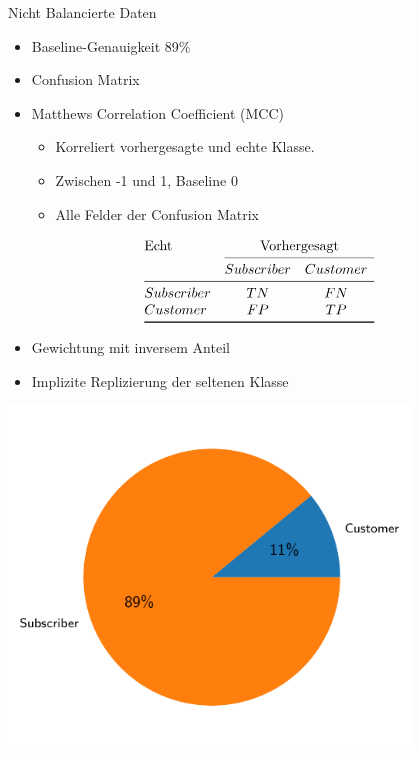 \begin{frame}{Nicht Balancierte Daten}
{
\begin{itemize}
\item Baseline-Genauigkeit 89\%
\item Confusion Matrix
\item Matthews Correlation Coefficient (MCC)
\begin{itemize}
\vspace{-1\baselineskip}
\item Korreliert vorhergesagte und echte Klasse.
\item Zwischen -1 und 1, Baseline 0
\item Alle Felder der Confusion Matrix
\end{itemize}
\end{itemize}
}
{
\[
\begin{array}{@{}l*{5}{c}@{}}
\text{Echt} & \multicolumn{2}{c@{}}{\text{Vorhergesagt}}\\
    \cmidrule(l){2-3}
    & Subscriber & Customer\\
\midrule
Subscriber & TN & FN  \\
Customer   & FP & TP  \\
\bottomrule
\end{array}
\]
\vspace{0.1cm}
}

{
\begin{itemize}
\item Gewichtung mit inversem Anteil
\item Implizite Replizierung der seltenen Klasse
\end{itemize}
}
\begin{minipage}{0.4\textwidth}
\centering
\includegraphics[width=0.8\textwidth]{../Images/Piechart}
\end{minipage}
\end{frame}

